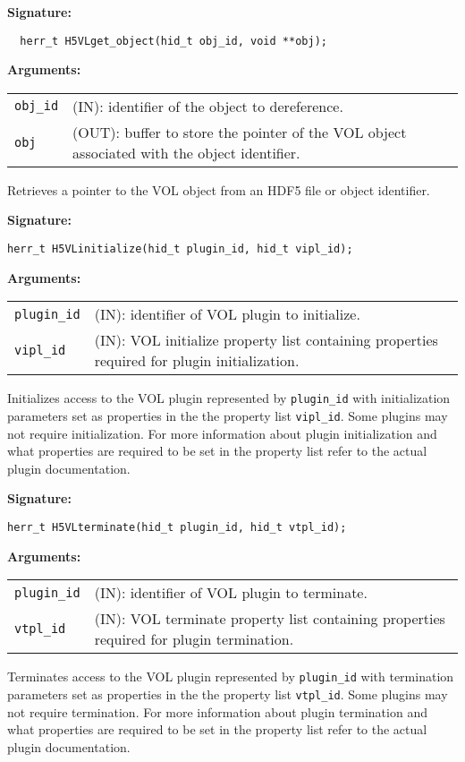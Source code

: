 \begin{mdframed}[style=bgbox]
\textbf{Signature:}
\begin{lstlisting}
  herr_t H5VLget_object(hid_t obj_id, void **obj); 
\end{lstlisting}

\textbf{Arguments:}\\
\begin{tabular}{l p{13.5cm}}
 {\tt obj\_id} & (IN): identifier of the object to dereference.\\
 {\tt obj} & (OUT): buffer to store the pointer of the VOL object associated with the object identifier.\\
\end{tabular}
\end{mdframed}
Retrieves a pointer to the VOL object from an HDF5 file or object identifier.\bigskip

\begin{mdframed}[style=bgbox]
\textbf{Signature:}
\begin{lstlisting}
herr_t H5VLinitialize(hid_t plugin_id, hid_t vipl_id);
\end{lstlisting}

\textbf{Arguments:}\\
\begin{tabular}{l p{13.5cm}}
 {\tt plugin\_id} & (IN): identifier of VOL plugin to initialize.\\
 {\tt vipl\_id} & (IN): VOL initialize property list containing properties required for plugin initialization.\\
\end{tabular}
\end{mdframed}
Initializes access to the VOL plugin represented by {\tt plugin\_id} with initialization parameters set as properties in the the property list {\tt vipl\_id}. Some plugins may not require initialization. For more information about plugin initialization and what properties are required to be set in the property list refer to the actual plugin documentation.\bigskip

\begin{mdframed}[style=bgbox]
\textbf{Signature:}
\begin{lstlisting}
herr_t H5VLterminate(hid_t plugin_id, hid_t vtpl_id);
\end{lstlisting}


\textbf{Arguments:}\\
\begin{tabular}{l p{13.5cm}}
 {\tt plugin\_id} & (IN): identifier of VOL plugin to terminate.\\
 {\tt vtpl\_id} & (IN): VOL terminate property list containing properties required for plugin termination.\\
\end{tabular}
\end{mdframed}
Terminates access to the VOL plugin represented by {\tt plugin\_id} with termination parameters set as properties in the the property list {\tt vtpl\_id}. Some plugins may not require termination. For more information about plugin termination and what properties are required to be set in the property list refer to the actual plugin documentation.


